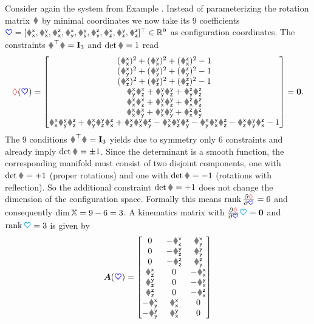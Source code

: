 \begin{Example}\label{Example:KinMatSO3}
Consider again the system from Example .
Instead of parameterizing the rotation matrix $\R$ by minimal coordinates we now take its 9 coefficients $\sysCoord = [\Rxx, \Ryx, \Rzx, \Rxy, \Ryy, \Rzy, \Rxz, \Ryz, \Rzz]^\top \in \RealNum^{9}$ as configuration coordinates.
The constraints $\R^\top \R = \idMat[3]$ and $\det\R = 1$ read
\begin{align}\label{eq:constraintSO3}
 \geoConstraint(\sysCoord) = 
  \begin{bmatrix}
  (\Rxx)^2 + (\Ryx)^2 + (\Rzx)^2 - 1 \\
  (\Rxy)^2 + (\Ryy)^2 + (\Rzy)^2 - 1 \\
  (\Rxz)^2 + (\Ryz)^2 + (\Rzz)^2 - 1 \\
  \Rxy \Rxz + \Ryy \Ryz + \Rzy \Rzz \\
  \Rxx \Rxz + \Ryx \Ryz + \Rzx \Rzz \\
  \Rxx \Rxy + \Ryx \Ryy + \Rzx \Rzy \\
  \Rxx \Ryy \Rzz + \Rxy \Ryz \Rzx + \Rxz \Ryx \Rzy - \Rxx \Ryz \Rzy - \Rxy \Ryx \Rzz - \Rxz \Ryy \Rzx - 1
 \end{bmatrix}
 = \tuple{0}.
\end{align}
The 9 conditions $\R^\top \R = \idMat[3]$ yields due to symmetry only 6 constraints and already imply $\det\R = \pm 1$.
Since the determinant is a smooth function, the corresponding manifold must consist of two disjoint components, one with $\det\R = +1$ (proper rotations) and one with $\det\R=-1$ (rotations with reflection).
So the additional constraint $\det\R = +1$ does not change the dimension of the configuration space.
Formally this means $\rank\pdiff[\geoConstraint]{\sysCoord} = 6$ and consequently $\dim\configSpace = 9-6 = 3$.
A kinematics matrix with $\pdiff[\geoConstraint]{\sysCoord} \kinMat = \mat{0}$ and $\rank\kinMat = 3$ is given by
\begin{align}\label{eq:KinMatSO3}
 \mat{A}(\sysCoord) =
 \begin{bmatrix}
  0 & -\Rxz & \Rxy \\
  0 & -\Ryz & \Ryy \\
  0 & -\Rzz & \Rzy \\
  \Rxz & 0 & -\Rxx \\
  \Ryz & 0 & -\Ryx \\
  \Rzz & 0 & -\Rzx \\
  -\Rxy & \Rxx & 0 \\
  -\Ryy & \Ryx & 0 \\

\end{bmatrix}
\end{align}
\end{Example}

